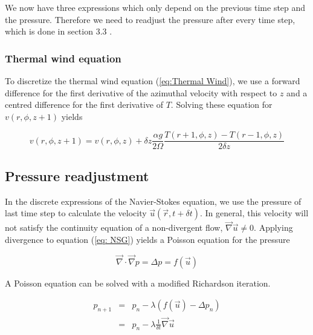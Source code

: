 \documentclass[12pt, a4paper]{article} %
\newcommand{\todoRef}{\todo[color=green!20]}
\begin{document}
			We now have three expressions which only depend on the previous time step and the pressure. Therefore we need to readjust the pressure after every time step, which is done in section 3.3 .
			
		\subsubsection{Thermal wind equation}
			To discretize the thermal wind equation (\ref{eq:Thermal Wind}), we use a forward difference for the first derivative of the azimuthal velocity with respect to $z$ and a centred difference for the first derivative of $T$. Solving these equation for $v(r,\phi, z+1)$ yields
			
			\begin{equation}
				v(r,\phi, z+1) = v(r,\phi,z) + \delta z \frac{\alpha g}{2\Omega} \frac{T(r+1,\phi,z) - T(r-1,\phi, z)}{2 \delta z}
				\label{eq:Discrete Thermal v}
			\end{equation}
		
			
	\subsection{Pressure readjustment} %
		In the discrete expressions of the Navier-Stokes equation, we use the pressure of last time step to calculate the velocity $\vec{u}(\vec{r},t+\delta t)$. In general, this velocity will not satisfy the continuity equation of a non-divergent flow, $\vec{\nabla} \vec{u} \neq 0$. Applying divergence to equation (\ref{eq: NSG}) yields a Poisson equation for the pressure
		
		\begin{equation}
			\vec{\nabla} \cdot \vec{\nabla} p = \Delta p = f(\vec{u})
			\label{eq:Poisson Pressure}
		\end{equation}
		
		A Poisson equation can be solved with a modified Richardson iteration. \todoRef{Fluiddynamik und Wiki} \cite{WikiRichardson} %
		
		\begin{eqnarray}
			p_{n+1} &=& p_n - \lambda \left(f(\vec{u}) - \Delta p_n\right)
			\nonumber \\
			&=& p_n - \lambda \frac{1}{\delta t} \vec{\nabla}\vec{u}
			\label{eq:Drucknachregelung p}
		\end{eqnarray}
		
\end{document}
